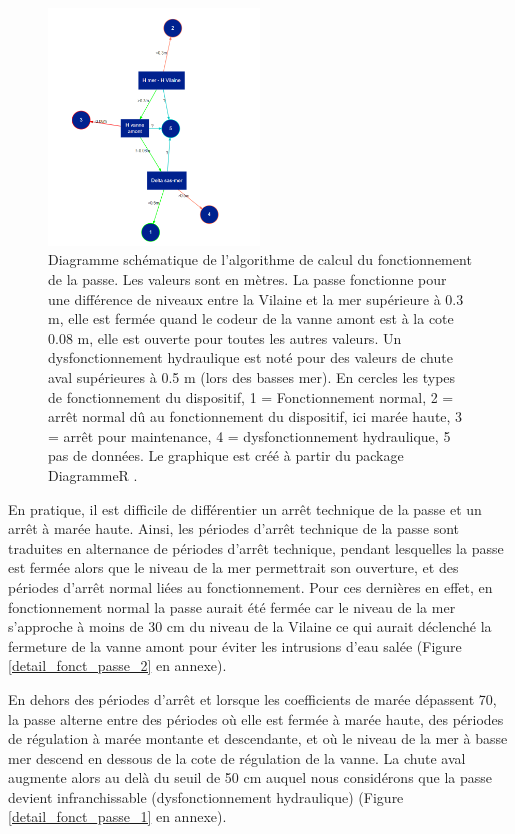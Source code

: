 \documentclass[11pt,twocolumn,titlepage,twoside]{article}\usepackage[]{graphicx}\usepackage[]{color}
\begin{document}
\begin{figure}[htpb]
\centering
\includegraphics[width=0.5\textwidth]{schema_fonctionnement_EV.png}
\caption{Diagramme schématique de l'algorithme de calcul du fonctionnement de la
passe. Les valeurs sont en mètres. La passe fonctionne pour une différence de
niveaux entre la Vilaine et la mer supérieure à 0.3 m, elle est fermée quand le
codeur de la vanne amont est à la cote 0.08 m, elle est ouverte pour toutes les
autres valeurs.
Un dysfonctionnement hydraulique est noté pour des valeurs de chute aval
supérieures à 0.5 m (lors des basses mer). En cercles les types de
fonctionnement du dispositif, 1 = Fonctionnement normal, 2 = arrêt normal dû au fonctionnement du dispositif, ici marée haute, 3 =
arrêt pour maintenance, 4 = dysfonctionnement hydraulique, 5 pas de données. Le
graphique est créé à partir du package DiagrammeR
\citep{Iannone_diagrammer_2019}.}
\label{figure_schema_fonctionnement}
\end{figure}

En pratique, il est difficile de différentier un arrêt technique de la passe et
un arrêt à marée haute. Ainsi, les périodes d'arrêt technique de la passe sont
traduites en alternance de périodes d'arrêt technique, pendant lesquelles la
passe est fermée alors que le niveau de la mer permettrait son ouverture, et des
périodes d'arrêt normal liées au fonctionnement. Pour ces dernières en effet, en
fonctionnement normal la passe aurait été fermée car le niveau de la mer s'approche à moins de 30 cm du niveau de la Vilaine ce qui
aurait déclenché la fermeture de la vanne amont pour éviter les intrusions d'eau
salée (Figure \ref{detail_fonct_passe_2} en annexe).

En dehors des périodes d'arrêt et lorsque les coefficients de marée dépassent
70, la passe alterne entre des périodes où elle est fermée à marée haute, des
périodes de régulation à marée montante et descendante, et où le niveau de la
mer à basse mer descend en dessous de la cote de régulation de la vanne. La
chute aval augmente alors au delà du seuil de 50 cm auquel nous
considérons que la passe devient infranchissable (dysfonctionnement hydraulique) 
(Figure \ref{detail_fonct_passe_1} en annexe).
\end{document}
